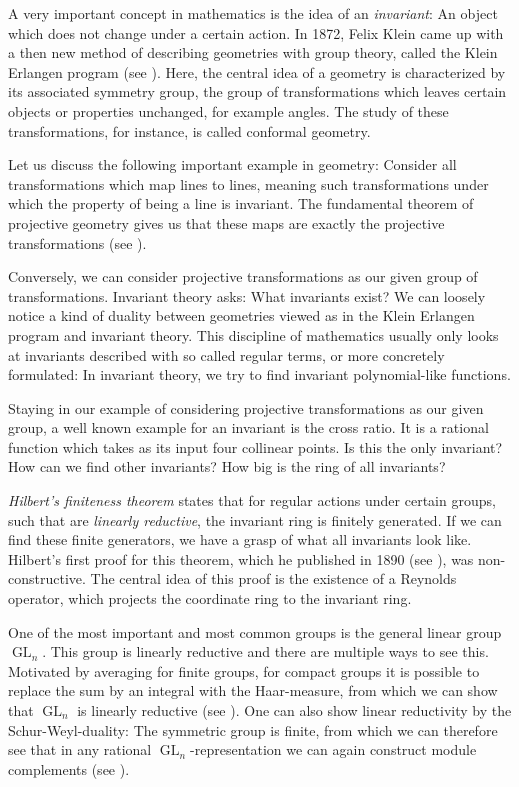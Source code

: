 A very important concept in mathematics is the idea of an \textit{invariant}:
An object which does not change under a certain action.
In 1872, Felix Klein came up with a then new method of describing geometries with group theory, called the Klein Erlangen program (see \cite{Kle93}).
Here, the central idea of a geometry is characterized by its associated symmetry group, the group of transformations which leaves certain objects or properties unchanged, for example angles.
The study of these transformations, for instance, is called conformal geometry.

Let us discuss the following important example in geometry:
Consider all transformations which map lines to lines, meaning such transformations under which the property of being a line is invariant.
The fundamental theorem of projective geometry gives us that these maps are exactly the projective transformations (see \cite[Ex V.44,~Ex I.51]{Aud03}).

Conversely, we can consider projective transformations as our given group of transformations.
Invariant theory asks: What invariants exist?
We can loosely notice a kind of duality between geometries viewed as in the Klein Erlangen program and invariant theory.
This discipline of mathematics usually only looks at invariants described with so called regular terms, or more concretely formulated:  In invariant theory, we try to find invariant polynomial-like functions.

Staying in our example of considering projective transformations as our given group, a well known example for an invariant is the cross ratio.
It is a rational function which takes as its input four collinear points.
Is this the only invariant?
How can we find other invariants?
How big is the ring of all invariants?

\textit{Hilbert's finiteness theorem} states that for regular actions under certain groups, such that are \textit{linearly reductive}, the invariant ring is finitely generated.
If we can find these finite generators, we have a grasp of what all invariants look like.
Hilbert's first proof for this theorem, which he published in 1890 (see \cite{Hil90}), was non-constructive.
The central idea of this proof is the existence of a Reynolds operator, which projects the coordinate ring to the invariant ring.

One of the most important and most common groups is the general linear group $\operatorname{GL}_n$.
This group is linearly reductive and there are multiple ways to see this.
Motivated by averaging for finite groups, for compact groups it is possible to replace the sum by an integral with the Haar-measure, from which we can show that $\operatorname{GL}_n$ is linearly reductive (see \cite[p.~285-288]{Kra85}).
One can also show linear reductivity by the Schur-Weyl-duality:  The symmetric group is finite, from which we can therefore see that in any rational $\operatorname{GL}_n$-representation we can again construct module complements (see \cite[p.~243]{Pro07}).

